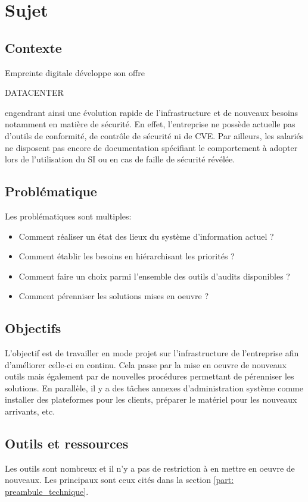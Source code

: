 \documentclass[12pt, a4paper, twoside]{article}
\begin{document}
\newpage
\section{Sujet}
\subsection{Contexte}
Empreinte digitale développe son offre \begin{hilite}DATACENTER\end{hilite} engendrant ainsi une évolution rapide de l'infrastructure et de nouveaux besoins notamment en matière de sécurité. 
En effet, l'entreprise ne possède actuelle pas d'outils de conformité, de contrôle de sécurité ni de \gls{CVE}. 
Par ailleurs, les salariés ne disposent pas encore de documentation spécifiant le comportement à adopter lors de l'utilisation du \gls{SI} ou en cas de faille de sécurité révélée.

\subsection{Problématique}
Les problématiques sont multiples:
\begin{itemize}
    \item Comment réaliser un état des lieux du système d'information actuel ?
    \item Comment établir les besoins en hiérarchisant les priorités ?
    \item Comment faire un choix parmi l'ensemble des outils d'audits disponibles ?
    \item Comment pérenniser les solutions mises en oeuvre ? 
\end{itemize}

\subsection{Objectifs}
L'objectif est de travailler en mode projet sur l'infrastructure de l'entreprise afin d'améliorer celle-ci en continu. 
Cela passe par la mise en oeuvre de nouveaux outils mais également par de nouvelles procédures permettant de pérenniser les solutions. 
En parallèle, il y a des tâches annexes d'administration système comme installer des plateformes pour les clients, préparer le matériel pour les nouveaux arrivants, etc.

\subsection{Outils et ressources}
Les outils sont nombreux et il n'y a pas de restriction à en mettre en oeuvre de nouveaux. 
Les principaux sont ceux cités dans la section \ref{part: preambule_technique}.
\end{document}
